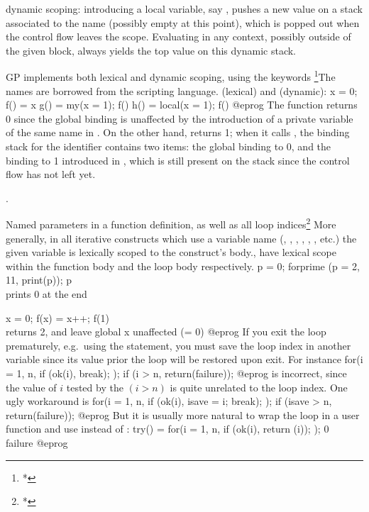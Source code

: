 \item{} dynamic scoping: introducing a local variable,
say , pushes a new value on a stack associated to the name 
(possibly empty at this point), which is popped out when the control flow
leaves the scope. Evaluating  in any context, possibly outside of the
given block, always yields the top value on this dynamic stack.

GP implements both lexical and dynamic scoping, using the keywords%
\footnote{*}{The names are borrowed from the  scripting language.}
 (lexical) and  (dynamic):
\bprog
  x = 0;
  f() = x
  g() =    my(x = 1); f()
  h() = local(x = 1); f()
@eprog\noindent
The function  returns 0 since the global  binding
is unaffected by the introduction of a private variable of the same name in
. On the other hand,  returns 1; when it calls , the
binding stack for the  identifier contains two items: the global
binding to 0, and the binding to 1 introduced in , which is still
present on the stack since the control flow has not left  yet.

.

Named parameters in a function definition, as well as all loop
indices\footnote{*}{
More generally, in all iterative constructs which use a variable name
(, , , , ,
, etc.) the given variable is lexically scoped to the construct's
body.},
have lexical scope within the function body and the loop body respectively.
\bprog
p = 0;
forprime (p = 2, 11, print(p)); p   \\ prints 0 at the end

x = 0;
f(x) = x++;
f(1)  \\ returns 2, and leave global x unaffected (= 0)
@eprog\noindent
If you exit the loop prematurely, e.g.~using the  statement, you
must save the loop index in another variable since its value prior the loop
will be restored upon exit. For instance
\bprog
  for(i = 1, n,
    if (ok(i), break);
  );
  if (i > n, return(failure));
@eprog\noindent
is incorrect, since the value of $i$ tested by the $(i > n)$ is quite
unrelated to the loop index. One ugly workaround is
\bprog
  for(i = 1, n,
    if (ok(i), isave = i; break);
  );
  if (isave > n, return(failure));
@eprog\noindent
But it is usually more natural to wrap the loop in a user function
and use  instead of :
\bprog
try() =
{
  for(i = 1, n,
    if (ok(i), return (i));
  );
  0 \\ failure
}
@eprog

